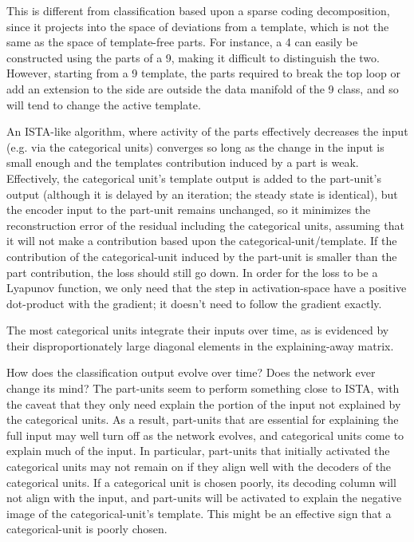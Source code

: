 This is different from classification based upon a sparse coding decomposition, since it projects into the space of deviations from a template, which is not the same as the space of template-free parts.  For instance, a 4 can easily be constructed using the parts of a 9, making it difficult to distinguish the two.  However, starting from a 9 template, the parts required to break the top loop or add an extension to the side are outside the data manifold of the 9 class, and so will tend to change the active template.  

An ISTA-like algorithm, where activity of the parts effectively decreases the input (e.g. via the categorical units) converges so long as the change in the input is small enough and the templates contribution induced by a part is weak.  Effectively, the categorical unit's template output is added to the part-unit's output (although it is delayed by an iteration; the steady state is identical), but the encoder input to the part-unit remains unchanged, so it minimizes the reconstruction error of the residual including the categorical units, assuming that it will not make a contribution based upon the categorical-unit/template.  If the contribution of the categorical-unit induced by the part-unit is smaller than the part contribution, the loss should still go down.  In order for the loss to be a Lyapunov function, we only need that the step in activation-space have a positive dot-product with the gradient; it doesn't need to follow the gradient exactly.

The most categorical units integrate their inputs over time, as is evidenced by their disproportionately large diagonal elements in the explaining-away matrix.

How does the classification output evolve over time?  Does the network ever change its mind?  The part-units seem to perform something close to ISTA, with the caveat that they only need explain the portion of the input not explained by the categorical units.  As a result, part-units that are essential for explaining the full input may well turn off as the network evolves, and categorical units come to explain much of the input.  In particular, part-units that initially activated the categorical units may not remain on if they align well with the decoders of the categorical units.  If a categorical unit is chosen poorly, its decoding column will not align with the input, and part-units will be activated to explain the negative image of the categorical-unit's template.  This might be an effective sign that a categorical-unit is poorly chosen.  


